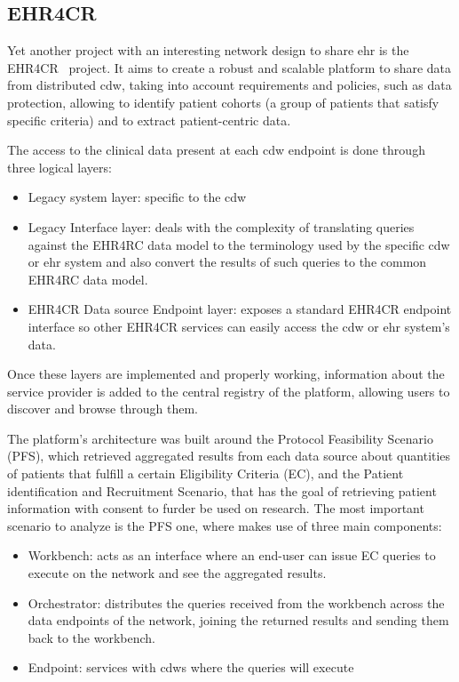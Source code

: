\subsection*{EHR4CR}
Yet another project with an interesting network design to share \gls{ehr} is the EHR4CR~\cite{ehr4cr} project.
It aims to create a robust and scalable platform to share data from distributed \gls{cdw}, taking into account requirements and policies, such as data protection, allowing to identify patient cohorts (a group of patients that satisfy specific criteria) and to extract patient-centric data.

The access to the clinical data present at each \gls{cdw} endpoint is done through three logical layers:
\begin{itemize}
    \item Legacy system layer: specific to the \gls{cdw}
    \item Legacy Interface layer: deals with the complexity of translating queries against the EHR4RC data model to the terminology used by the specific \gls{cdw} or \gls{ehr} system and also convert the results of such queries to the common EHR4RC data model.
    \item EHR4CR Data source Endpoint layer: exposes a standard EHR4CR endpoint interface so other EHR4CR services can easily access the \gls{cdw} or \gls{ehr} system's data.
\end{itemize}
Once these layers are implemented and properly working, information about the service provider is added to the central registry of the platform, allowing users to discover and browse through them.

The platform's architecture was built around the Protocol Feasibility Scenario (PFS), which retrieved aggregated results from each data source about quantities of patients that fulfill a certain Eligibility Criteria (EC), and the Patient identification and Recruitment Scenario, that has the goal of retrieving patient information with consent to furder be used on research.
The most important scenario to analyze is the PFS one, where makes use of three main components:
\begin{itemize}
    \item Workbench: acts as an interface where an end-user can issue EC queries to execute on the network and see the aggregated results.
    \item Orchestrator: distributes the queries received from the workbench across the data endpoints of the network, joining the returned results and sending them back to the workbench.
    \item Endpoint: services with \gls{cdw}s where the queries will execute
\end{itemize}

